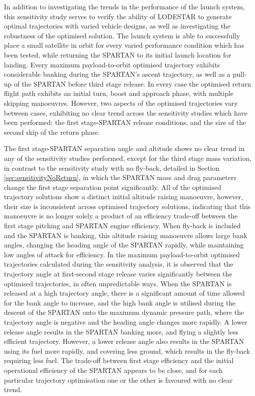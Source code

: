 In addition to investigating the trends in the performance of the launch system, this sensitivity study serves to verify the ability of LODESTAR to generate optimal trajectories with varied vehicle designs, as well as investigating the robustness of the optimised solution.
The launch system is able to successfully place a small satellite in orbit for every varied performance condition which has been tested, while returning the SPARTAN to its initial launch location for landing. 
Every maximum payload-to-orbit optimised trajectory exhibits considerable banking during the SPARTAN's ascent trajectory, as well as a pull-up of the SPARTAN before third stage release. 
In every case the optimised return flight path exhibits an initial turn, boost and approach phase, with multiple skipping manoeuvres. 
However, two aspects of the optimised trajectories vary between cases, exhibiting no clear trend across the sensitivity studies which have been performed; the first stage-SPARTAN release conditions, and the size of the second skip of the return phase. 

The first stage-SPARTAN separation angle and altitude shows no clear trend in any of the sensitivity studies performed, except for the third stage mass variation, in contrast to the sensitivity study with no fly-back, detailed in Section \ref{sec:sensitivityNoReturn}, in which the SPARTAN mass and drag parameters change the first stage separation point significantly. All of the optimised trajectory solutions show a distinct initial altitude raising manoeuvre, however, their size is inconsistent across optimised trajectory solutions, indicating that this manoeuvre is no longer solely a product of an efficiency trade-off between the first stage pitching and SPARTAN engine efficiency. When fly-back is included and the SPARTAN is banking, this altitude raising manoeuvre allows large bank angles, changing the heading angle of the SPARTAN rapidly, while maintaining low angles of attack for efficiency. 
In the maximum payload-to-orbit optimised trajectories calculated during the sensitivity analysis, it is observed that the trajectory angle at first-second stage release varies significantly between the optimised trajectories, in often unpredictable ways. When the SPARTAN is released at a high trajectory angle, there is a significant amount of time allowed for the bank angle to increase, and the high bank angle is utilised during the descent of the SPARTAN onto the maximum dynamic pressure path, where the trajectory angle is negative and the heading angle changes more rapidly. 
 A lower release angle results in the SPARTAN banking more, and flying a slightly less efficient trajectory. However, a lower release angle also results in the SPARTAN using its fuel more rapidly, and covering less ground, which results in the fly-back requiring less fuel. 
The trade-off between first stage efficiency and the initial operational efficiency of the SPARTAN appears to be close, and 
for each particular trajectory optimisation one or the other is favoured with no clear trend. 


